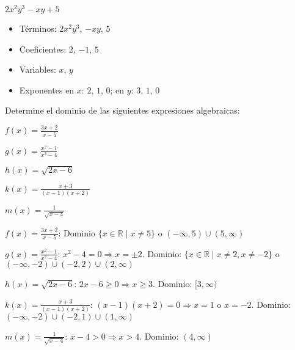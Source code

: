 \begin{exercise}
\begin{solucion}
\begin{exerciselist}
    \item $2x^2y^3 - xy + 5$
    \begin{itemize}
        \item Términos: $2x^2y^3$, $-xy$, $5$
        \item Coeficientes: $2$, $-1$, $5$
        \item Variables: $x$, $y$
        \item Exponentes en $x$: $2$, $1$, $0$; en $y$: $3$, $1$, $0$
    \end{itemize}
\end{exerciselist}
\end{solucion}
\end{exercise}

\begin{exercise}
\problem Determine el dominio de las siguientes expresiones algebraicas:

\begin{exerciselist}
    \item $f(x) = \frac{3x + 2}{x - 5}$
    \item $g(x) = \frac{x^2 - 1}{x^2 - 4}$
    \item $h(x) = \sqrt{2x - 6}$
    \item $k(x) = \frac{x + 3}{(x - 1)(x + 2)}$
    \item $m(x) = \frac{1}{\sqrt{x - 4}}$
\end{exerciselist}

\begin{solucion}
\begin{exerciselist}
    \item $f(x) = \frac{3x + 2}{x - 5}$: Dominio $\{x \in \mathbb{R} \mid x \neq 5\}$ o $(-\infty, 5) \cup (5, \infty)$
    
    \item $g(x) = \frac{x^2 - 1}{x^2 - 4}$: $x^2 - 4 = 0 \Rightarrow x = \pm 2$. Dominio: $\{x \in \mathbb{R} \mid x \neq 2, x \neq -2\}$ o $(-\infty, -2) \cup (-2, 2) \cup (2, \infty)$
    
    \item $h(x) = \sqrt{2x - 6}$: $2x - 6 \geq 0 \Rightarrow x \geq 3$. Dominio: $[3, \infty)$
    
    \item $k(x) = \frac{x + 3}{(x - 1)(x + 2)}$: $(x - 1)(x + 2) = 0 \Rightarrow x = 1$ o $x = -2$. Dominio: $(-\infty, -2) \cup (-2, 1) \cup (1, \infty)$
    
    \item $m(x) = \frac{1}{\sqrt{x - 4}}$: $x - 4 > 0 \Rightarrow x > 4$. Dominio: $(4, \infty)$
\end{exerciselist}
\end{solucion}
\end{exercise}

